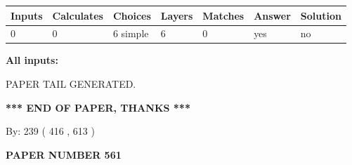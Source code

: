 \documentclass[12pt]{article}
\begin{document}
 
\noindent{}
 
 
   
   
   
   
\noindent\begin{tabular}{|l|l|l|l|l|l|l|}
 \hline
Inputs & Calculates & Choices & Layers & Matches & Answer & Solution \\ \hline
 0  & 
 0  & 
 6
  simple  
  & 
 6  & 
 0  & 
  yes & 
  no 
  \\ \hline
 \end{tabular}
   
   
   
   
\noindent{}
   
   
   
   
\noindent\vspace{0.1in}\hspace{-0.08in} {\textbf{\Large{All inputs: }}}
   
   
   
   
   
   
 \vspace{0.2in}
 
   
   
\vspace{2.0in} PAPER TAIL GENERATED.
   
   
   
   
\vspace{1.0in} 
{\textbf{\large{ *** END OF PAPER, THANKS *** }}} 
   
   
\hspace{1.0in} By: 
 239 ( 416 ,  613 )
   
   
   
   
\newpage 
\setcounter{page}{ 
   561001 } 
   
   
   
   
 {\textbf{ \Large{ PAPER NUMBER  561  }}}
   
   
\vspace{0.2in}
   
   
   
   
   
   
   
   
 \vspace{0.2in}
 
\end{document}
